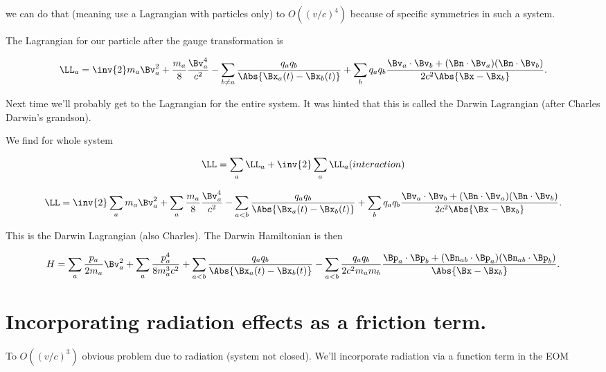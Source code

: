 we can do that (meaning use a Lagrangian with particles only) to $O((v/c)^4)$ because of specific symmetries in such a system.

The Lagrangian for our particle after the gauge transformation is

\begin{equation}\label{eqn:relativisticElectrodynamicsL26:30}
\LL_a = \inv{2} m_a \Bv_a^2 + \frac{m_a}{8} \frac{\Bv_a^4}{c^2} 
-\sum_{b \ne a} \frac{q_a q_b}{\Abs{\Bx_a(t) - \Bx_b(t)}}
+\sum_b q_a q_b \frac{\Bv_a \cdot \Bv_b + (\Bn \cdot \Bv_a) (\Bn \cdot \Bv_b)}{2 c^2 \Abs{\Bx - \Bx_b} }.
\end{equation}

Next time we'll probably get to the Lagrangian for the entire system.  It was hinted that this is called the Darwin Lagrangian (after Charles Darwin's grandson).

We find for whole system

\begin{equation}\label{eqn:relativisticElectrodynamicsL26:50}
\LL =  \sum_a \LL_a + \inv{2} \sum_a \LL_a (interaction)
\end{equation}

\begin{equation}\label{eqn:relativisticElectrodynamicsL26:70}
\LL = \inv{2} \sum_a m_a \Bv_a^2 + \sum_a \frac{m_a}{8} \frac{\Bv_a^4}{c^2} 
-\sum_{ a < b} \frac{q_a q_b}{\Abs{\Bx_a(t) - \Bx_b(t)}}
+\sum_b q_a q_b \frac{\Bv_a \cdot \Bv_b + (\Bn \cdot \Bv_a) (\Bn \cdot \Bv_b)}{2 c^2 \Abs{\Bx - \Bx_b} }.
\end{equation}

This is the Darwin Lagrangian (also Charles).  The Darwin Hamiltonian is then

\begin{equation}\label{eqn:relativisticElectrodynamicsL26:90}
H = \sum_a \frac{p_a}{2 m_a} \Bv_a^2 + \sum_a \frac{p_a^4}{8 m_a^3 c^2} 
+\sum_{ a < b} \frac{q_a q_b}{\Abs{\Bx_a(t) - \Bx_b(t)}}
- \sum_{ a < b } \frac{q_a q_b}{ 2 c^2 m_a m_b } \frac{\Bp_a \cdot \Bp_b + (\Bn_{a b} \cdot \Bp_a) (\Bn_{ a b } \cdot \Bp_b)}{\Abs{\Bx - \Bx_b} }.
\end{equation}

\section{Incorporating radiation effects as a friction term.}

To $O((v/c)^3)$ obvious problem due to radiation (system not closed).  We'll incorporate radiation via a function term in the EOM


